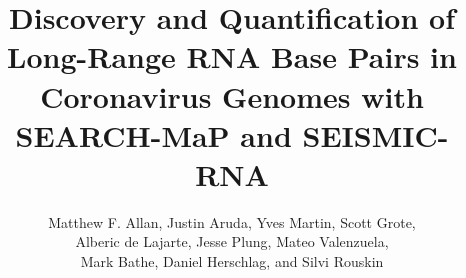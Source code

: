 \documentclass[12pt,a4paper]{article}
\title{Discovery and Quantification of Long-Range RNA Base Pairs in Coronavirus Genomes with SEARCH-MaP and SEISMIC-RNA}
\author{Matthew F. Allan, Justin Aruda, Yves Martin, Scott Grote,\\ Alberic de Lajarte, Jesse Plung, Mateo Valenzuela,\\ Mark Bathe, Daniel Herschlag, and Silvi Rouskin}
\begin{document}
\sloppy

\maketitle
\newpage

\newpage

\newpage

%
\newpage

\newpage
\begin{singlespace}
	
	
\end{singlespace}
\end{document}
